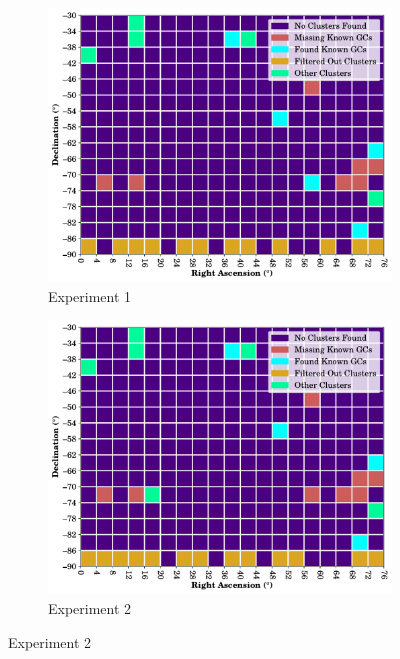 \begin{figure}[H]
    \centering
    \caption{\label{fig:a3-cluster-overview}Clustering Results Across A3 for All Experiments}
    \begin{subfigure}[b]{0.49\textwidth}
        \includegraphics[width=\textwidth]{./figures/rasters/grids/grid-run-01-a3.pdf}
        \caption{Experiment 1}
    \end{subfigure}
    \begin{subfigure}[b]{0.49\textwidth}
        \includegraphics[width=\textwidth]{./figures/rasters/grids/grid-run-02-a3.pdf}
        \caption{Experiment 2}
    \end{subfigure}


\end{figure}
